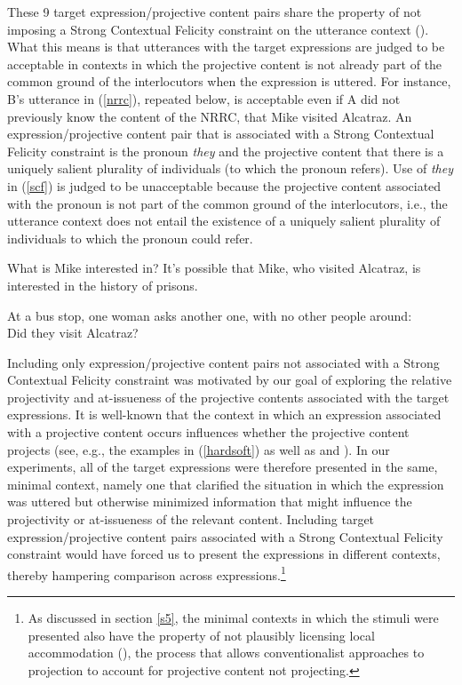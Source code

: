 \documentclass[11pt,fleqn]{article}
\newcommand{\6}{\mbox{$[\hspace*{-.6mm}[$}}
\newcommand{\9}{\mbox{$]\hspace*{-.6mm}]$}}
\def\infelic{{\leavevmode\llap{\#}}}
\begin{document}
These 9 target expression/projective content pairs share the property of not imposing a Strong Contextual Felicity constraint on the utterance context (\citealt{brst-lang11}). What this means is that utterances with the target expressions are judged to be acceptable in contexts in which the projective content is not already part of the common ground of the interlocutors when the expression is uttered. For instance, B's utterance in (\ref{nrrc}), repeated below, is acceptable even if A did not previously know the content of the NRRC, that Mike visited Alcatraz. An expression/projective content pair that is associated with a Strong Contextual Felicity constraint is the pronoun {\em they} and the projective content that there is a uniquely salient plurality of individuals (to which the pronoun refers). Use of {\em they} in (\ref{scf}) is judged to be unacceptable because the projective content associated with the pronoun is not part of the common ground of the interlocutors, i.e., the utterance context does not entail the existence of a uniquely salient plurality of individuals to which the pronoun could refer. 

\begin{exe}
\exi{(\ref{nrrc})}
\begin{xlist}
 What is Mike interested in?
 It's possible that Mike, who visited Alcatraz, is interested in the history of prisons.
\end{xlist}

\ex\label{scf} At a bus stop, one woman asks another one, with no other people around: \\ \infelic Did they visit Alcatraz?
\end{exe}

Including only expression/projective content pairs not associated with a Strong Contextual Felicity constraint was motivated by our goal of exploring the relative projectivity and at-issueness of the projective contents associated with the target expressions. It is well-known that the context in which an expression associated with a projective content occurs influences whether the projective content projects (see, e.g., the examples in (\ref{hardsoft}) as well as \citealt{simons01} and \citealt{beaver-belly}). In our experiments, all of the target expressions were therefore presented in the same, minimal context, namely one that clarified the situation in which the expression was uttered but  otherwise minimized information that might influence the projectivity or at-issueness of the relevant content. Including target expression/projective content pairs associated with a Strong Contextual Felicity constraint would have forced us to present the expressions in different contexts, thereby hampering comparison across expressions.\footnote{As discussed in section \ref{s5}, the minimal contexts in which the stimuli were presented also have the property of not plausibly licensing local accommodation (\citealt{heim83,vds92}), the process that allows conventionalist approaches to projection to account for projective content not projecting.}
\end{document}
